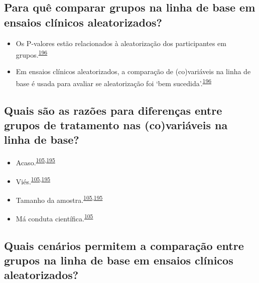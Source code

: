 \documentclass[
  a4paper,
]{book}
\begin{document}
\hypertarget{para-quuxea-comparar-grupos-na-linha-de-base-em-ensaios-cluxednicos-aleatorizados}{%
\subsection{Para quê comparar grupos na linha de base em ensaios clínicos aleatorizados?}\label{para-quuxea-comparar-grupos-na-linha-de-base-em-ensaios-cluxednicos-aleatorizados}}

\begin{itemize}
\item
  Os P-valores estão relacionados à aleatorização dos participantes em grupos.\textsuperscript{\protect\hyperlink{ref-Bolzern2019}{196}}
\item
  Em ensaios clínicos aleatorizados, a comparação de (co)variáveis na linha de base é usada para avaliar se aleatorização foi `bem sucedida'.\textsuperscript{\protect\hyperlink{ref-Bolzern2019}{196}}
\end{itemize}

\hypertarget{quais-suxe3o-as-razuxf5es-para-diferenuxe7as-entre-grupos-de-tratamento-nas-covariuxe1veis-na-linha-de-base}{%
\subsection{Quais são as razões para diferenças entre grupos de tratamento nas (co)variáveis na linha de base?}\label{quais-suxe3o-as-razuxf5es-para-diferenuxe7as-entre-grupos-de-tratamento-nas-covariuxe1veis-na-linha-de-base}}

\begin{itemize}
\item
  Acaso.\textsuperscript{\protect\hyperlink{ref-chen2020}{105},\protect\hyperlink{ref-Stang2018}{195}}
\item
  Viés.\textsuperscript{\protect\hyperlink{ref-chen2020}{105},\protect\hyperlink{ref-Stang2018}{195}}
\item
  Tamanho da amostra.\textsuperscript{\protect\hyperlink{ref-chen2020}{105},\protect\hyperlink{ref-Stang2018}{195}}
\item
  Má conduta científica.\textsuperscript{\protect\hyperlink{ref-chen2020}{105}}
\end{itemize}

\hypertarget{quais-cenuxe1rios-permitem-a-comparauxe7uxe3o-entre-grupos-na-linha-de-base-em-ensaios-cluxednicos-aleatorizados}{%
\subsection{Quais cenários permitem a comparação entre grupos na linha de base em ensaios clínicos aleatorizados?}\label{quais-cenuxe1rios-permitem-a-comparauxe7uxe3o-entre-grupos-na-linha-de-base-em-ensaios-cluxednicos-aleatorizados}}
\end{document}
